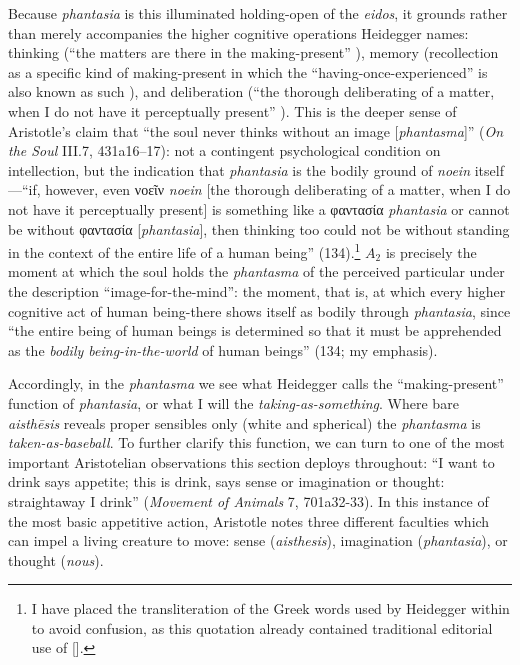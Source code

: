 \documentclass{article}
\newcommand{\gk}[1]{{\greekfont #1}}
\begin{document}
Because \textit{phantasia} is this illuminated holding-open of the \textit{eidos}, it grounds rather than merely accompanies the higher cognitive operations Heidegger names: thinking (``the matters are there in the making-present'' ), memory (recollection as a specific kind of making-present in which the ``having-once-experienced'' is also known as such ), and deliberation (``the thorough deliberating of a matter, when I do not have it perceptually present'' ). This is the deeper sense of Aristotle's claim that ``the soul never thinks without an image [\textit{phantasma}]'' (\textit{On the Soul} III.7, 431a16–17): not a contingent psychological condition on intellection, but the indication that \textit{phantasia} is the bodily ground of \textit{noein} itself---``if, however, even \gk{νοεῖν} {\textit{noein}} [the thorough deliberating of a matter, when I do not have it perceptually present] is something like a \gk{φαντασία} {\textit{phantasia}} or cannot be without \gk{φαντασία} [\textit{phantasia}], then thinking too could not be without standing in the context of the entire life of a human being'' (134).\footnote{I have placed the transliteration of the Greek words used by Heidegger within {} to avoid confusion, as this quotation already contained traditional editorial use of [].} $A_2$ is precisely the moment at which the soul holds the \textit{phantasma} of the perceived particular under the description ``image-for-the-mind'': the moment, that is, at which every higher cognitive act of human being-there shows itself as bodily through \textit{phantasia}, since ``the entire being of human beings is determined so that it must be apprehended as the \textit{bodily being-in-the-world} of human beings'' (134; my emphasis).

Accordingly, in the \textit{phantasma} we see what Heidegger calls the ``making-present'' function of \textit{phantasia}, or what I will the \textit{taking-as-something}. Where bare \textit{aisthēsis} reveals proper sensibles only (white and spherical) the \textit{phantasma} is \textit{taken-as-baseball}. To further clarify this function, we can turn to one of the most important Aristotelian observations this section deploys throughout: ``I want to drink says appetite; this is drink, says sense or imagination or thought: straightaway I drink'' (\textit{Movement of Animals} 7, 701a32-33). In this instance of the most basic appetitive action, Aristotle notes three different faculties which can impel a living creature to move: sense (\textit{aisthesis}), imagination (\textit{phantasia}), or thought (\textit{nous}). 
\end{document}

